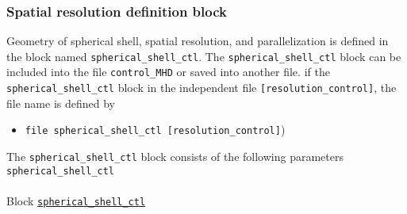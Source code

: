 \subsubsection{Spatial resolution definition block}
\label{section:resolution_block}

Geometry of spherical shell, spatial resolution, and parallelization is defined in the block named \verb|spherical_shell_ctl|. The \verb|spherical_shell_ctl| block can be included into the file {\tt control\_MHD} or saved into another file.  if the \verb|spherical_shell_ctl| block in the independent file {\tt [resolution\_control]}, the file name is defined by
%
\begin{itemize}
\item {\tt   file    spherical\_shell\_ctl        [resolution\_control]})
\end{itemize}
The \verb|spherical_shell_ctl| block consists of the following parameters
%
\verb|spherical_shell_ctl|
\label{href_i:spherical_shell_ctl}
\\
\\
%
Block \hyperref[href_t:spherical_shell_ctl]{\tt spherical\_shell\_ctl}
%
